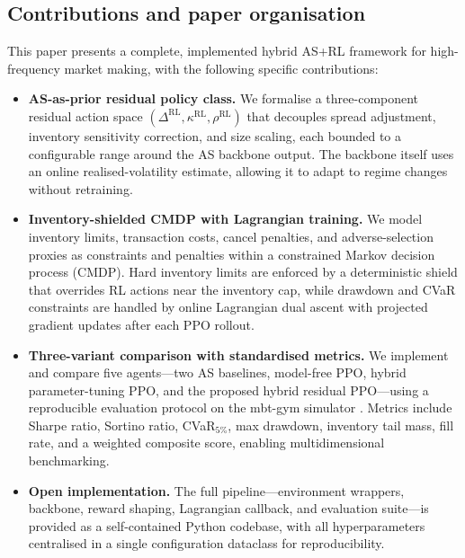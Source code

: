 \documentclass[11pt]{article}
\begin{document}
\subsection{Contributions and paper organisation}

This paper presents a complete, implemented hybrid AS+RL framework for
high-frequency market making, with the following specific contributions:

\begin{itemize}[leftmargin=*, itemsep=3pt]
  \item \textbf{AS-as-prior residual policy class.}
    We formalise a three-component residual action space
    $(\Delta^{\text{RL}}, \kappa^{\text{RL}}, \rho^{\text{RL}})$ that
    decouples spread adjustment, inventory sensitivity correction, and
    size scaling, each bounded to a configurable range around the AS
    backbone output.
    The backbone itself uses an online realised-volatility estimate,
    allowing it to adapt to regime changes without retraining.

  \item \textbf{Inventory-shielded CMDP with Lagrangian training.}
    We model inventory limits, transaction costs, cancel penalties, and
    adverse-selection proxies as constraints and penalties within a
    constrained Markov decision process (CMDP).
    Hard inventory limits are enforced by a deterministic shield that
    overrides RL actions near the inventory cap, while drawdown and
    CVaR constraints are handled by online Lagrangian dual ascent with
    projected gradient updates after each PPO rollout.

  \item \textbf{Three-variant comparison with standardised metrics.}
    We implement and compare five agents---two AS baselines, model-free
    PPO, hybrid parameter-tuning PPO, and the proposed hybrid residual
    PPO---using a reproducible evaluation protocol on the mbt-gym
    simulator \parencite{jerome2023mbtgym}.
    Metrics include Sharpe ratio, Sortino ratio, CVaR$_{5\%}$, max
    drawdown, inventory tail mass, fill rate, and a weighted composite
    score, enabling multidimensional benchmarking.

  \item \textbf{Open implementation.}
    The full pipeline---environment wrappers, backbone, reward shaping,
    Lagrangian callback, and evaluation suite---is provided as a
    self-contained Python codebase, with all hyperparameters centralised
    in a single configuration dataclass for reproducibility.
\end{itemize}
\end{document}
